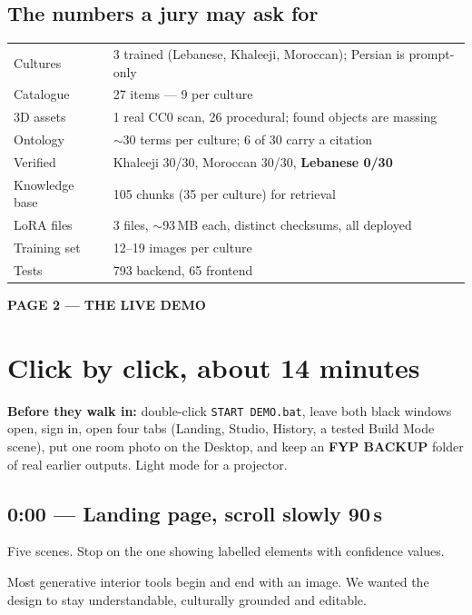\documentclass[10.5pt,a4paper]{article}
\newcommand{\pagelabel}[2]{%
  {\sffamily\bfseries\scriptsize\color{brass}\MakeUppercase{Page #1 --- #2}}\par\vspace{0.2em}}
\begin{document}
\subsection*{The numbers a jury may ask for}
\begin{tabularx}{\linewidth}{@{}lX@{}}
\toprule
Cultures & 3 trained (Lebanese, Khaleeji, Moroccan); Persian is prompt-only\\
Catalogue & 27 items --- 9 per culture\\
3D assets & 1 real CC0 scan, 26 procedural; found objects are massing\\
Ontology & $\sim$30 terms per culture; 6 of 30 carry a citation\\
Verified & Khaleeji 30/30, Moroccan 30/30, \textbf{Lebanese 0/30}\\
Knowledge base & 105 chunks (35 per culture) for retrieval\\
LoRA files & 3 files, $\sim$93\,MB each, distinct checksums, all deployed\\
Training set & 12--19 images per culture\\
Tests & 793 backend, 65 frontend\\
\bottomrule
\end{tabularx}

\newpage
\pagelabel{2}{the live demo}
\section*{Click by click, about 14 minutes}

\textbf{Before they walk in:} double-click \texttt{START DEMO.bat}, leave both black windows open,
sign in, open four tabs (Landing, Studio, History, a tested Build Mode scene), put one room photo on
the Desktop, and keep an \textbf{FYP BACKUP} folder of real earlier outputs. Light mode for a projector.

\subsection*{0:00 --- Landing page, scroll slowly \hfill \textnormal{\small 90\,s}}
Five scenes. Stop on the one showing labelled elements with confidence values.
\begin{sayit}
Most generative interior tools begin and end with an image. We wanted the design to stay
understandable, culturally grounded and editable.
\end{sayit}
\end{document}
